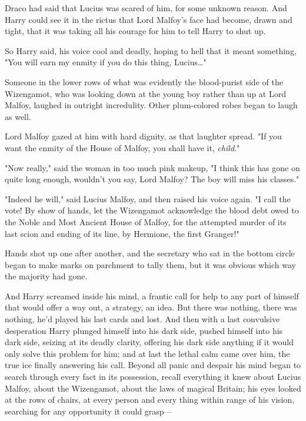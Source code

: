 Draco had said that Lucius was scared of him, for some unknown reason. And 
Harry could see it in the rictus that Lord Malfoy's face had become, drawn and 
tight, that it was taking all his courage for him to tell Harry to shut up.

So Harry said, his voice cool and deadly, hoping to hell that it meant 
something, "You will earn my enmity if you do this thing, Lucius{\ldots}"

Someone in the lower rows of what was evidently the blood-purist side of the 
Wizengamot, who was looking down at the young boy rather than up at Lord 
Malfoy, laughed in outright incredulity. Other plum-colored robes began to 
laugh as well.

Lord Malfoy gazed at him with hard dignity, as that laughter spread. "If you 
want the enmity of the House of Malfoy, you shall have it, \emph{child}."

"Now really," said the woman in too much pink makeup, "I think this has gone on 
quite long enough, wouldn't you say, Lord Malfoy? The boy will miss his 
classes."

"Indeed he will," said Lucius Malfoy, and then raised his voice again. "I call 
the vote! By show of hands, let the Wizengamot acknowledge the blood debt owed 
to the Noble and Most Ancient House of Malfoy, for the attempted murder of its 
last scion and ending of its line, by Hermione, the first Granger!"

Hands shot up one after another, and the secretary who sat in the bottom circle 
began to make marks on parchment to tally them, but it was obvious which way 
the majority had gone.

And Harry screamed inside his mind, a frantic call for help to any part of 
himself that would offer a way out, a strategy, an idea. But there was nothing, 
there was nothing, he'd played his last cards and lost. And then with a last 
convulsive desperation Harry plunged himself into his dark side, pushed himself 
into his dark side, seizing at its deadly clarity, offering his dark side 
anything if it would only solve this problem for him; and at last the lethal 
calm came over him, the true ice finally answering his call. Beyond all panic 
and despair his mind began to search through every fact in its possession, 
recall everything it knew about Lucius Malfoy, about the Wizengamot, about the 
laws of magical Britain; his eyes looked at the rows of chairs, at every person 
and every thing within range of his vision, searching for any opportunity it 
could grasp---